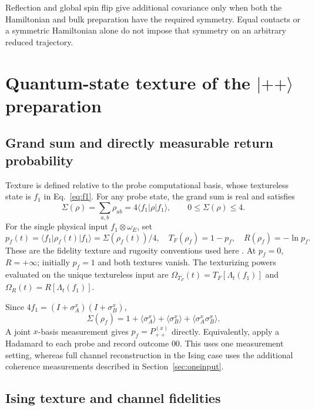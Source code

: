 \documentclass[11pt,a4paper]{article}
\newcommand{\ket}[1]{\lvert #1\rangle}
\newcommand{\bra}[1]{\langle #1\rvert}
\newcommand{\OmF}{\Omega_{T_F}}
\newcommand{\OmR}{\Omega_R}
\begin{document}
Reflection and global spin flip give additional covariance only when
both the Hamiltonian and bulk preparation have the required symmetry.
Equal contacts or a symmetric Hamiltonian alone do not impose that
symmetry on an arbitrary reduced trajectory.

\section{Quantum-state texture of the \texorpdfstring{$\ket{++}$}{++} preparation}
\label{sec:texture}

\subsection{Grand sum and directly measurable return probability}

Texture is defined relative to the probe computational basis, whose
textureless state is $f_1$ in Eq.~\eqref{eq:f1}. For any probe state,
the grand sum is real and satisfies
\begin{equation}
 \Sigma(\rho)=\sum_{a,b}\rho_{ab}=4\bra{f_1}\rho\ket{f_1},
 \qquad 0\le\Sigma(\rho)\le4.
\end{equation}
For the single physical input $f_1\otimes\omega_E$, set
\begin{equation}
 p_f(t)=\bra{f_1}\rho_f(t)\ket{f_1}=\Sigma(\rho_f(t))/4,
 \quad T_F(\rho_f)=1-p_f,\quad R(\rho_f)=-\ln p_f.
 \label{eq:textures}
\end{equation}
These are the fidelity texture and rugosity conventions used here
\cite{Parisio2024,Vieira2026}. At $p_f=0$, $R=+\infty$; initially
$p_f=1$ and both textures vanish. The texturizing powers evaluated on
the unique textureless input are $\OmF(t)=T_F[\Lambda_t(f_1)]$ and
$\OmR(t)=R[\Lambda_t(f_1)]$.

Since $4f_1=(I+\sigma_A^x)(I+\sigma_B^x)$,
\begin{equation}
 \Sigma(\rho_f)=1+\langle\sigma_A^x\rangle
 +\langle\sigma_B^x\rangle+\langle\sigma_A^x\sigma_B^x\rangle.
 \label{eq:measurement}
\end{equation}
A joint $x$-basis measurement gives $p_f=P_{++}^{(x)}$ directly.
Equivalently, apply a Hadamard to each probe and record outcome $00$.
This uses one measurement setting, whereas full channel reconstruction
in the Ising case uses the additional coherence measurements described
in Section~\ref{sec:oneinput}.

\subsection{Ising texture and channel fidelities}
\end{document}
